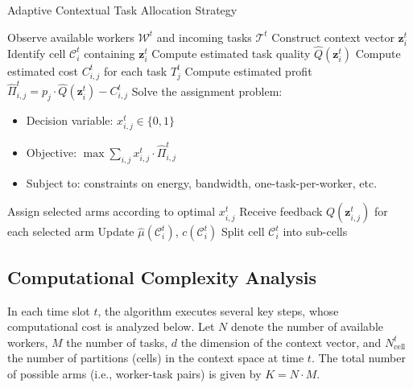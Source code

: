 \begin{algorithm}[H]
\caption{Adaptive Contextual Task Allocation Strategy}
\label{alg:adaptive}
\begin{algorithmic}[1]
    \STATE Observe available workers $\mathcal{W}^t$ and incoming tasks $\mathcal{T}^t$
        \STATE Construct context vector $\mathbf{z}_i^t$
        \STATE Identify cell $\mathcal{C}_i^t$ containing $\mathbf{z}_i^t$
        \STATE Compute estimated task quality $\hat{Q}(\mathbf{z}_i^t)$
        \STATE Compute estimated cost $C_{i,j}^t$ for each task $T_j^t$
        \STATE Compute estimated profit $\hat{\Pi}_{i,j}^t = p_j \cdot \hat{Q}(\mathbf{z}_i^t) - C_{i,j}^t$
    \ENDFOR
    \STATE Solve the assignment problem:
        \begin{itemize}
            \item Decision variable: $x_{i,j}^t \in \{0,1\}$
            \item Objective: $\max \sum_{i,j} x_{i,j}^t \cdot \hat{\Pi}_{i,j}^t$
            \item Subject to: constraints on energy, bandwidth, one-task-per-worker, etc.
        \end{itemize}
    \STATE Assign selected arms according to optimal $x_{i,j}^t$
    \STATE Receive feedback $Q(\mathbf{z}_{i,j}^t)$ for each selected arm
        \STATE Update $\hat{\mu}(\mathcal{C}_i^t)$, $c(\mathcal{C}_i^t)$
            \STATE Split cell $\mathcal{C}_i^t$ into sub-cells
        \ENDIF
    \ENDFOR
\ENDFOR
\end{algorithmic}
\end{algorithm}

\subsection{Computational Complexity Analysis}

In each time slot \( t \), the algorithm executes several key steps, whose computational cost is analyzed below. Let \( N \) denote the number of available workers, \( M \) the number of tasks, \( d \) the dimension of the context vector, and \( N_{\text{cell}}^t \) the number of partitions (cells) in the context space at time \( t \). The total number of possible arms (i.e., worker-task pairs) is given by \( K = N \cdot M \).

